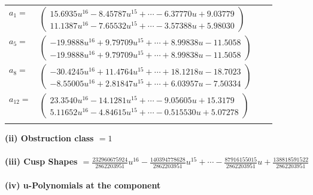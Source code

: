 \documentclass[1p]{elsarticle_modified}
\theoremstyle{definition}
\begin{document}
\begin{tabular}{m{7pt} m{180pt} m{7pt} m{180pt} }
\flushright $a_{1}=$&$\begin{pmatrix}15.6935 u^{16}-8.45787 u^{15}+\cdots-6.37770 u+9.03779\\11.1387 u^{16}-7.65532 u^{15}+\cdots-3.57388 u+5.98030\end{pmatrix}$ \\
\flushright $a_{5}=$&$\begin{pmatrix}-19.9888 u^{16}+9.79709 u^{15}+\cdots+8.99838 u-11.5058\\-19.9888 u^{16}+9.79709 u^{15}+\cdots+8.99838 u-11.5058\end{pmatrix}$ \\
\flushright $a_{8}=$&$\begin{pmatrix}-30.4245 u^{16}+11.4764 u^{15}+\cdots+18.1218 u-18.7023\\-8.55005 u^{16}+2.81847 u^{15}+\cdots+6.03957 u-7.50334\end{pmatrix}$ \\
\flushright $a_{12}=$&$\begin{pmatrix}23.3540 u^{16}-14.1281 u^{15}+\cdots-9.05605 u+15.3179\\5.11652 u^{16}-4.84615 u^{15}+\cdots-0.515530 u+5.07278\end{pmatrix}$\\&\end{tabular}
\flushleft \textbf{(ii) Obstruction class $= 1$}\\~\\
\flushleft \textbf{(iii) Cusp Shapes $= \frac{232960675924}{2862203951} u^{16}-\frac{140394778628}{2862203951} u^{15}+\cdots-\frac{87916155015}{2862203951} u+\frac{138818591522}{2862203951}$}\\~\\
\newpage\renewcommand{\arraystretch}{1}
\flushleft \textbf{(iv) u-Polynomials at the component}\newline \\
\end{document}
